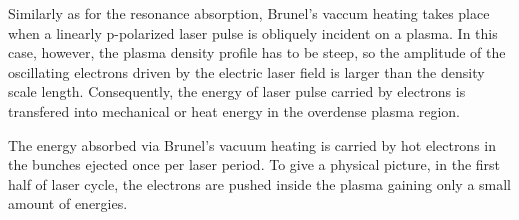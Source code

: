 Similarly as for the resonance absorption, Brunel's vaccum heating takes place when a linearly p-polarized laser pulse is obliquely incident on a plasma. In this case, however, the plasma density profile has to be steep, so the amplitude of the oscillating electrons driven by the electric laser field is larger than the density scale length. Consequently, the energy of laser pulse carried by electrons is transfered into mechanical or heat energy in the overdense plasma region.

The energy absorbed via Brunel's vacuum heating is carried by hot electrons in the bunches
ejected once per laser period. To give a physical picture, in the first half of laser cycle, the electrons are pushed inside the plasma gaining only a small amount of energies. 